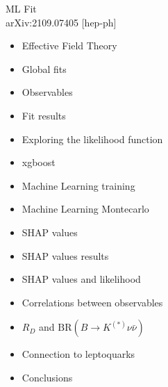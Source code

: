 \documentclass[mathserif, 10pt]{beamer}
\begin{document}
\begin{frame}[plain] %
    \begin{block}{{\Large ML Fit}\\arXiv:2109.07405 [hep-ph]}
        \begin{itemize}
            \item Effective Field Theory
            \item Global fits
            \item Observables
            \item Fit results
            \item Exploring the likelihood function
            \item xgboost
            \item Machine Learning training
            \item Machine Learning Montecarlo
            \item SHAP values
            \item SHAP values results
            \item SHAP values and likelihood
            \item Correlations between observables
            \item $R_D$ and $\mathrm{BR}(B\to K^{(*)}\nu\bar{\nu})$
            \item Connection to leptoquarks
            \item Conclusions
        \end{itemize}
    \end{block}
\end{frame}
\end{document}
